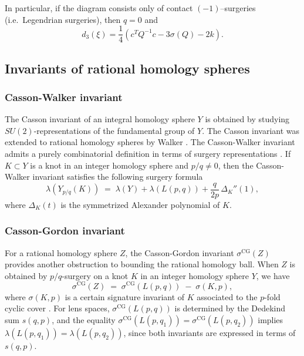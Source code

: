 \documentclass[12pt]{amsart}
\theoremstyle{definition}
\theoremstyle{definition}
\begin{document}
In particular, if the diagram consists only of contact
$(-1)$–surgeries (i.e.\ Legendrian surgeries),
then $q=0$ and
\[
d_3(\xi)
=
\frac{1}{4}
\left(
c^T Q^{-1} c
-
3\sigma(Q)
-
2k
\right).
\]

\subsection{Invariants of rational homology spheres}

\subsubsection*{Casson-Walker invariant}
The Casson invariant of an integral homology sphere $Y$ is obtained by studying $SU(2)$-representations of the fundamental group of $Y$. The Casson invariant was extended to rational homology spheres by Walker \cite{Walker}. The Casson-Walker invariant admits a purely combinatorial definition in terms of surgery representations \cite{Lescop}.  If $K \subset Y$ is a knot in an integer homology sphere and $p/q \neq 0$, then the Casson-Walker invariant satisfies the following surgery formula
\begin{equation*}
\lambda(Y_{p/q}(K)) \;=\; \lambda(Y) + \lambda(L(p,q))
+ \frac{q}{2p}\,\Delta_K''(1),
\end{equation*}
where $\Delta_K(t)$ is the symmetrized Alexander polynomial of $K$.

\subsubsection*{Casson-Gordon invariant}

For a rational homology sphere $Z$,
the Casson-Gordon invariant $\sigma^{\mathrm{CG}}(Z)
$ provides another obstruction to bounding the rational homology ball.  When $Z$ is obtained by $p/q$-surgery on a knot $K$ in an integer homology sphere $Y$, we have
\begin{equation}
\sigma^{\mathrm{CG}}(Z) \;=\;
\sigma^{\mathrm{CG}}(L(p,q)) \;-\; \sigma(K,p),
\end{equation}
where $\sigma(K,p)$ is a certain signature invariant of $K$ associated to the $p$-fold cyclic cover \cite{CassonGordon}.
For lens spaces, $\sigma^{\mathrm{CG}}(L(p,q))$ is determined by the Dedekind sum $s(q,p)$, and the equality
$\sigma^{\mathrm{CG}}(L(p,q_1)) = \sigma^{\mathrm{CG}}(L(p,q_2))$ implies
$\lambda(L(p,q_1)) = \lambda(L(p,q_2))$, since both invariants are
expressed in terms of $s(q,p)$.
\end{document}
